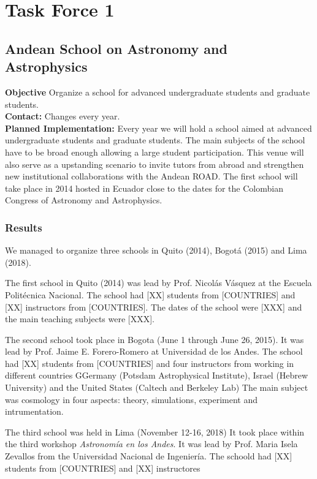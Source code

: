 \section{Task Force 1}
\label{chapter2}
\textit{}


\subsection{Andean School on Astronomy and Astrophysics}
\textbf{Objective} Organize a school for advanced undergraduate students and graduate students.
\\
\textbf{Contact:} Changes every year.
\\
\textbf{Planned Implementation:} 
Every year we will hold a school aimed at advanced undergraduate students and graduate students. 
The main subjects of the school have to be broad enough allowing a large student participation. 
This venue will also serve as a upstanding scenario to invite tutors from abroad and strengthen new institutional collaborations with the Andean ROAD. 
The first school will take place in 2014 hosted in Ecuador close to the dates for the Colombian Congress of Astronomy and Astrophysics.

\subsubsection{Results}

We managed to organize three schools in Quito (2014), Bogot\'a (2015) and Lima (2018). 

The first school in Quito (2014) was lead by Prof. Nicol\'as V\'asquez at the Escuela Polit\'ecnica Nacional. 
The school had [XX] students from [COUNTRIES] and [XX] instructors from [COUNTRIES]. 
The dates of the school were [XXX] and the main teaching subjects were [XXX].

The second school took place in Bogota (June 1 through June 26, 2015). 
It was lead by Prof. Jaime E. Forero-Romero at Universidad de los Andes. 
The school had [XX] students from [COUNTRIES] and four instructors from working in 
different countries GGermany (Potsdam Astrophysical Institute), 
Israel (Hebrew University) and the United States (Caltech and Berkeley Lab)
The main subject was cosmology in four aspects: theory, simulations, experiment and intrumentation.

The third school was held in Lima (November 12-16, 2018)
It took place within the third workshop \emph{Astronom\'ia en los Andes}. 
It was lead by Prof. Maria Isela Zevallos from the Universidad Nacional de Ingenier\'ia.
The schoold had [XX] students from [COUNTRIES] and [XX] instructores 



